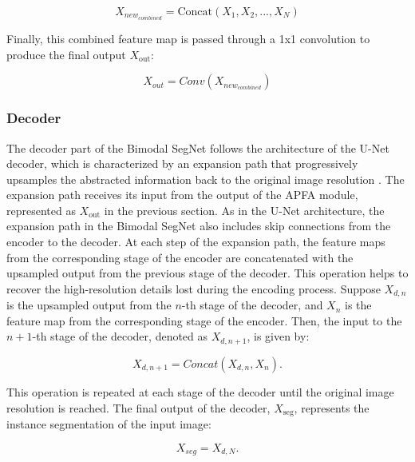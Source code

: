 \documentclass[lettersize,journal]{IEEEtran}
\begin{document}
\begin{equation}
X_{new_{combined}} = \text{Concat}(X_1, X_2, ..., X_N)
\end{equation}


Finally, this combined feature map is passed through a 1x1 convolution to produce the final output $X_{\text{out}}$:

\begin{equation}
X_{out} = {Conv} (X_{new_{combined}})
\end{equation}











\subsubsection{\textbf{Decoder }}
\label{subsubsection : Decoder}


The decoder part of the Bimodal SegNet follows the architecture of the U-Net decoder, which is characterized by an expansion path that progressively upsamples the abstracted information back to the original image resolution \cite{Huang2022CM-UNet:Scenes}. The expansion path receives its input from the output of the APFA module, represented as $X_{\text{out}}$ in the previous section. As in the U-Net architecture, the expansion path in the Bimodal SegNet also includes skip connections from the encoder to the decoder. At each step of the expansion path, the feature maps from the corresponding stage of the encoder are concatenated with the upsampled output from the previous stage of the decoder. This operation helps to recover the high-resolution details lost during the encoding process. Suppose $X_{d, n}$ is the upsampled output from the $n$-th stage of the decoder, and $X_n$ is the feature map from the corresponding stage of the encoder. Then, the input to the $n+1$-th stage of the decoder, denoted as $X_{d, n+1}$, is given by:

\begin{equation}
    X_{d, n+1} = {Concat}(X_{d, n}, X_n).
\end{equation}

This operation is repeated at each stage of the decoder until the original image resolution is reached. The final output of the decoder, $X_{\text{seg}}$, represents the instance segmentation of the input image:

\begin{equation}
    X_{seg} = X_{d, N}.
\end{equation}
\end{document}
